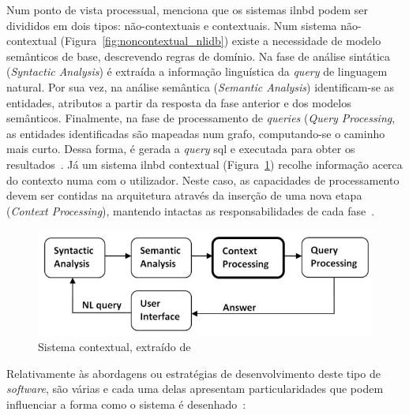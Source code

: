 Num ponto de vista processual, \textcite{novel_approach_towards_incorporating_context_processing_nlidb} menciona que os sistemas \gls{ilnbd} podem ser divididos em dois tipos: não-contextuais e contextuais. Num sistema não-contextual (Figura~\ref{fig:noncontextual_nlidb}) existe a necessidade de modelo semânticos de base, descrevendo regras de domínio. Na fase de análise sintática (\textit{Syntactic Analysis}) é extraída a informação linguística da \textit{query} de linguagem natural. Por sua vez, na análise semântica (\textit{Semantic Analysis}) identificam-se as entidades, atributos a partir da resposta da fase anterior e dos modelos semânticos. Finalmente, na fase de processamento de \textit{queries} (\textit{Query Processing}, as entidades identificadas são mapeadas num grafo, computando-se o caminho mais curto. Dessa forma, é gerada a \textit{query} \gls{sql} e executada para obter os resultados~\parencite{novel_approach_towards_incorporating_context_processing_nlidb}. Já um sistema \gls{ilnbd} contextual (Figura~\ref{fig:contextual_nlidb}) recolhe informação acerca do contexto numa  com o utilizador. Neste caso, as capacidades de processamento devem ser contidas na arquitetura através da inserção de uma nova etapa (\textit{Context Processing}), mantendo intactas as responsabilidades de cada fase~\parencite{novel_approach_towards_incorporating_context_processing_nlidb}.

\begin{figure}[!h]
    \centering
    \includegraphics[width=.7\textwidth]{ch03/assets/contextual_nlidb.jpg}
    \caption{Sistema  contextual, extraído de~\textcite{novel_approach_towards_incorporating_context_processing_nlidb}}
    \label{fig:contextual_nlidb}
\end{figure}

Relativamente às abordagens ou estratégias de desenvolvimento deste tipo de \textit{software}, são várias e cada uma delas apresentam particularidades que podem influenciar a forma como o sistema é desenhado~\parencite{nlidb_brief_review, survey_nlidb}:

